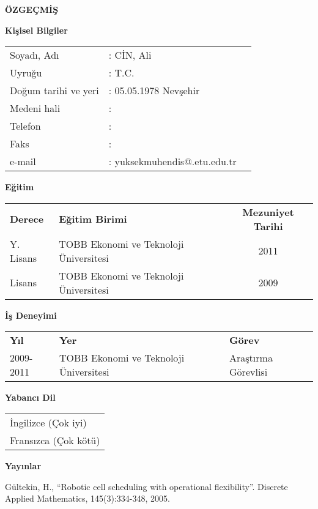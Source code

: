 \newpage
\pagestyle{plain}
\begin{center}
{\LARGE \bf \"OZGE\c{C}M\.{I}\c{S}}
\end{center}
\vspace{0.5cm}
{\bf Ki\c{s}isel Bilgiler}


\noindent
\begin{tabular}{@{}lll@{}}
Soyad{\i}, Ad{\i} & : C\.{I}N, Ali &\\
Uyru\u{g}u & : T.C.&\\
Do\u{g}um tarihi ve yeri & : 05.05.1978 Nev\c{s}ehir&\\
Medeni hali & : &\\
Telefon & : &\\
Faks & : &\\
e-mail & : yuksekmuhendis@.etu.edu.tr &\\
\end{tabular}

\vspace{0.5cm}
\noindent
{\bf E\u{g}itim}


\noindent
\begin{tabular}{@{}llc@{}}
{\bf Derece} & {\bf E\u{g}itim Birimi} & {\bf Mezuniyet Tarihi}\\
Y. Lisans & TOBB Ekonomi ve Teknoloji \"Universitesi & 2011\\
Lisans & TOBB Ekonomi ve Teknoloji \"Universitesi& 2009\\
\end{tabular}

\vspace{0.5cm}
\noindent
{\bf \.{I}\c{s} Deneyimi}


\noindent
\begin{tabular}{@{}lll@{}}
{\bf Y{\i}l} & {\bf Yer} & {\bf G\"orev}\\
2009-2011 & TOBB Ekonomi ve Teknoloji \"Universitesi & Ara\c{s}t{\i}rma G\"orevlisi\\
\end{tabular}

\vspace{0.5cm}
\noindent
{\bf Yabanc{\i} Dil}


\noindent
\begin{tabular}{@{}l@{}}
\.{I}ngilizce (\c{C}ok iyi)\\
Frans{\i}zca (\c{C}ok k\"ot\"u)\\
\end{tabular}


\vspace{0.5cm}
\noindent
{\bf Yay{\i}nlar}


\noindent
G\"ultekin, H., ``Robotic cell scheduling with operational flexibility''. Discrete Applied Mathematics, 145(3):334-348, 2005.\\
